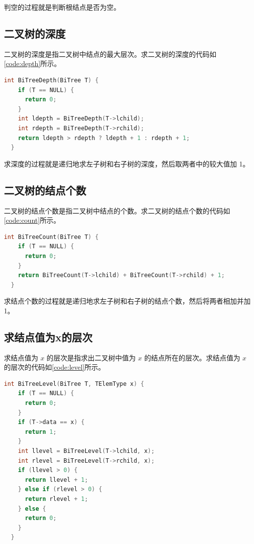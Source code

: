 \documentclass[lang=cn,newtx,10pt,scheme=chinese]{elegantbook}
\begin{document}
判空的过程就是判断根结点是否为空。

\subsection{二叉树的深度}

二叉树的深度是指二叉树中结点的最大层次。求二叉树的深度的代码如\ref{code:depth}所示。

\begin{lstlisting}[language=C++, caption={求深度}, label={code:depth}]
  int BiTreeDepth(BiTree T) {
    if (T == NULL) {
      return 0;
    }
    int ldepth = BiTreeDepth(T->lchild);
    int rdepth = BiTreeDepth(T->rchild);
    return ldepth > rdepth ? ldepth + 1 : rdepth + 1;
  }

\end{lstlisting}

求深度的过程就是递归地求左子树和右子树的深度，然后取两者中的较大值加 1。

\subsection{二叉树的结点个数}

二叉树的结点个数是指二叉树中结点的个数。求二叉树的结点个数的代码如\ref{code:count}所示。

\begin{lstlisting}[language=C++, caption={求结点个数}, label={code:count}]
  int BiTreeCount(BiTree T) {
    if (T == NULL) {
      return 0;
    }
    return BiTreeCount(T->lchild) + BiTreeCount(T->rchild) + 1;
  }

\end{lstlisting}

求结点个数的过程就是递归地求左子树和右子树的结点个数，然后将两者相加并加 1。

\subsection{求结点值为x的层次}

求结点值为 $x$ 的层次是指求出二叉树中值为 $x$ 的结点所在的层次。求结点值为 $x$ 的层次的代码如\ref{code:level}所示。

\begin{lstlisting}[language=C++, caption={求结点值为x的层次}, label={code:level}]
  int BiTreeLevel(BiTree T, TElemType x) {
    if (T == NULL) {
      return 0;
    }
    if (T->data == x) {
      return 1;
    }
    int llevel = BiTreeLevel(T->lchild, x);
    int rlevel = BiTreeLevel(T->rchild, x);
    if (llevel > 0) {
      return llevel + 1;
    } else if (rlevel > 0) {
      return rlevel + 1;
    } else {
      return 0;
    }
  }

\end{lstlisting}
\end{document}

